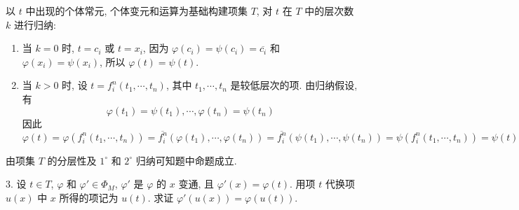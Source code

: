 \documentclass[boxes]{homework}
\begin{document}
\begin{solution}
    以 $t$ 中出现的个体常元, 个体变元和运算为基础构建项集 $T$, 对 $t$ 在 $T$ 中的层次数 $k$ 进行归纳:
    \begin{enumerate}[label = $\arabic*^\circ$, itemsep = 0em, topsep = .5em, partopsep = .5em]
        \item 当 $k=0$ 时, $t=c_i$ 或 $t=x_i$, 因为 $\varphi(c_i)=\psi(c_i)=\overline{c_i}$ 和 $\varphi(x_i)=\psi(x_i)$, 所以 $\varphi(t)=\psi(t)$.
        \item 当 $k>0$ 时, 设 $t = f_i^n(t_1, \cdots, t_n)$, 其中 $t_1, \cdots, t_n$ 是较低层次的项. 由归纳假设, 有
              $$
                  \varphi(t_1) = \psi(t_1), \cdots, \varphi(t_n) = \psi(t_n)
              $$
              因此
              $$
                  \varphi(t) = \varphi(f_i^n(t_1, \cdots, t_n)) = \overline{f_i^n}(\varphi(t_1), \cdots, \varphi(t_n)) = \overline{f_i^n}(\psi(t_1), \cdots, \psi(t_n)) = \psi(f_i^n(t_1, \cdots, t_n)) = \psi(t)
              $$
    \end{enumerate}
    由项集 $T$ 的分层性及 $1^\circ$ 和 $2^\circ$ 归纳可知题中命题成立.
\end{solution}

\begin{problem}
3. 设 $t\in T$, $\varphi$ 和 $\varphi'\in \Phi_M$, $\varphi'$ 是 $\varphi$ 的 $x$ 变通, 且 $\varphi'(x)=\varphi(t)$. 用项 $t$ 代换项 $u(x)$ 中 $x$ 所得的项记为 $u(t)$. 求证 $\varphi'(u(x)) = \varphi(u(t))$.
\end{problem}
\end{document}
